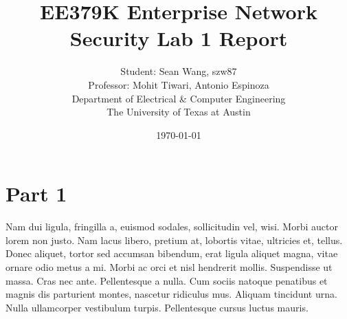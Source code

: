 \documentclass[11pt]{article}
\author{Student: Sean Wang, szw87 \\ Professor: Mohit Tiwari, Antonio Espinoza \\ Department of Electrical \& Computer Engineering \\ The University of Texas at Austin}
\date{\today}
\title{EE379K Enterprise Network Security Lab 1 Report}
\begin{document}
\maketitle
\section*{Part 1}
Nam dui ligula, fringilla a, euismod sodales, sollicitudin vel, wisi. Morbi
auctor lorem non justo. Nam lacus libero, pretium at, lobortis vitae, ultricies
et, tellus. Donec aliquet, tortor sed accumsan bibendum, erat ligula aliquet
magna, vitae ornare odio metus a mi. Morbi ac orci et nisl hendrerit mollis.
Suspendisse ut massa. Cras nec ante. Pellentesque a nulla. Cum sociis natoque
penatibus et magnis dis parturient montes, nascetur ridiculus mus. Aliquam
tincidunt urna. Nulla ullamcorper vestibulum turpis. Pellentesque cursus luctus
mauris.
\end{document}
